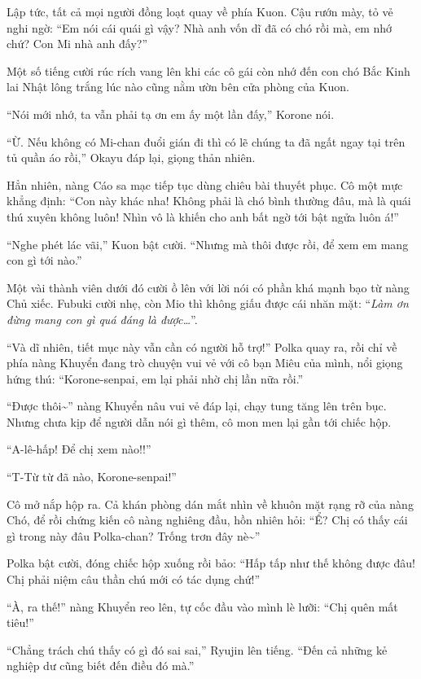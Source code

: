 \documentclass[../main.tex]{subfiles}
\begin{document}
Lập tức, tất cả mọi người đồng loạt quay về phía Kuon. Cậu rướn mày, tỏ vẻ nghi ngờ: ``Em nói cái quái gì vậy? Nhà anh vốn dĩ đã có chó rồi mà, em nhớ chứ? Con Mi nhà anh đấy?''

Một số tiếng cười rúc rích vang lên khi các cô gái còn nhớ đến con chó Bắc Kinh lai Nhật lông trắng lúc nào cũng nằm ườn bên cửa phòng của Kuon.

``Nói mới nhớ, ta vẫn phải tạ ơn em ấy một lần đấy,'' Korone nói.

``Ừ. Nếu không có Mi-chan đuổi gián đi thì có lẽ chúng ta đã ngất ngay tại trên tủ quần áo rồi,'' Okayu đáp lại, giọng thản nhiên.

Hẳn nhiên, nàng Cáo sa mạc tiếp tục dùng chiêu bài thuyết phục. Cô một mực khẳng định: ``Con này khác nha! Không phải là chó bình thường đâu, mà là quái thú xuyên không luôn! Nhìn vô là khiến cho anh bất ngờ tới bật ngửa luôn á!''

``Nghe phét lác vãi,'' Kuon bật cười. ``Nhưng mà thôi được rồi, để xem em mang con gì tới nào.''

Một vài thành viên dưới đó cười ồ lên với lời nói có phần khá mạnh bạo từ nàng Chủ xiếc. Fubuki cười nhẹ, còn Mio thì không giấu được cái nhăn mặt: ``\textit{Làm ơn đừng mang con gì quá đáng là được\dots}''.

``Và dĩ nhiên, tiết mục này vẫn cần có người hỗ trợ!'' Polka quay ra, rồi chỉ về phía nàng Khuyển đang trò chuyện vui vẻ với cô bạn Miêu của mình, nổi giọng hứng thú: ``Korone-senpai, em lại phải nhờ chị lần nữa rồi.''

``Được thôi\~{}'' nàng Khuyển nâu vui vẻ đáp lại, chạy tung tăng lên trên bục. Nhưng chưa kịp để người dẫn nói gì thêm, cô mon men lại gần tới chiếc hộp.

``A-lê-hấp! Để chị xem nào!!''

``T-Từ từ đã nào, Korone-senpai!''

Cô mở nắp hộp ra. Cả khán phòng dán mắt nhìn về khuôn mặt rạng rỡ của nàng Chó, để rồi chứng kiến cô nàng nghiêng đầu, hồn nhiên hỏi: ``Ể? Chị có thấy cái gì trong này đâu Polka-chan? Trống trơn đây nè\~{}''

Polka bật cười, đóng chiếc hộp xuống rồi bảo: ``Hấp tấp như thế không được đâu! Chị phải niệm câu thần chú mới có tác dụng chứ!''

``À, ra thế!'' nàng Khuyển reo lên, tự cốc đầu vào mình lè lưỡi: ``Chị quên mất tiêu!''

``Chẳng trách chú thấy có gì đó sai sai,'' Ryujin lên tiếng. ``Đến cả những kẻ nghiệp dư cũng biết đến điều đó mà.''
\end{document}
